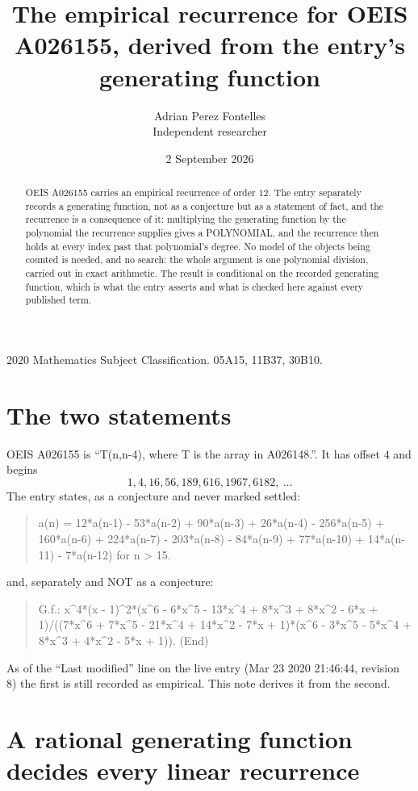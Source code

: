 \documentclass[11pt,a4paper]{article}
\title{The empirical recurrence for OEIS A026155, derived from the entry's generating function}
\author{Adrian Perez Fontelles\\ \small Independent researcher}
\date{2 September 2026}
\theoremstyle{plain}
\theoremstyle{definition}
\begin{document}
\maketitle

\begin{abstract}
OEIS A026155 carries an empirical recurrence of order $12$. The entry separately records a
generating function, not as a conjecture but as a statement of fact, and the recurrence is a
consequence of it: multiplying the generating function by the polynomial the recurrence
supplies gives a POLYNOMIAL, and the recurrence then holds at every index past that
polynomial's degree. No model of the objects being counted is needed, and no search: the
whole argument is one polynomial division, carried out in exact arithmetic. The result is
conditional on the recorded generating function, which is what the entry asserts and what is
checked here against every published term.
\end{abstract}

\noindent\small 2020 Mathematics Subject Classification. 05A15, 11B37, 30B10.\normalsize

\section{The two statements}

OEIS A026155 is ``T(n,n-4), where T is the array in A026148.''. It has offset $4$ and begins
\[
1, 4, 16, 56, 189, 616, 1967, 6182,\ \dots
\]
The entry states, as a conjecture and never marked settled:
\begin{quote}
a(n) = 12*a(n-1) - 53*a(n-2) + 90*a(n-3) + 26*a(n-4) - 256*a(n-5) + 160*a(n-6) + 224*a(n-7) - 203*a(n-8) - 84*a(n-9) + 77*a(n-10) + 14*a(n-11) - 7*a(n-12) for n > 15.
\end{quote}
and, separately and NOT as a conjecture:
\begin{quote}
G.f.: x\^{}4*(x - 1)\^{}2*(x\^{}6 - 6*x\^{}5 - 13*x\^{}4 + 8*x\^{}3 + 8*x\^{}2 - 6*x + 1)/((7*x\^{}6 + 7*x\^{}5 - 21*x\^{}4 + 14*x\^{}2 - 7*x + 1)*(x\^{}6 - 3*x\^{}5 - 5*x\^{}4 + 8*x\^{}3 + 4*x\^{}2 - 5*x + 1)). (End)
\end{quote}
As of the ``Last modified'' line on the live entry (Mar 23 2020 21:46:44, revision 8) the first is still
recorded as empirical. This note derives it from the second.

\section{A rational generating function decides every linear recurrence}
\end{document}
